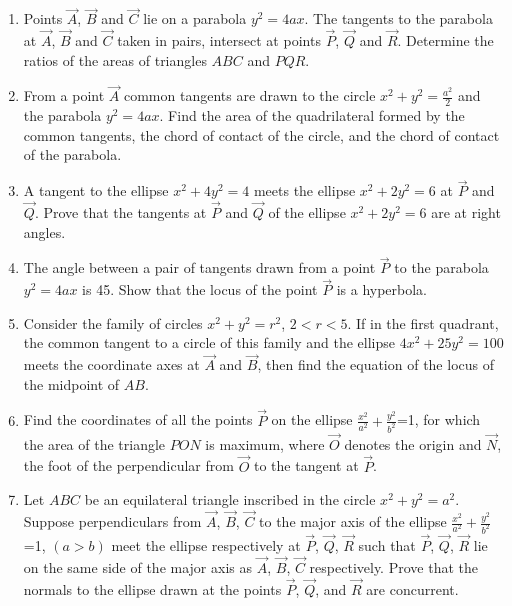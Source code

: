 \begin{enumerate}
\item Points $\vec{A}$, $\vec{B}$ and $\vec{C}$ lie on a parabola $y^2=4ax$. The tangents to the parabola at $\vec{A}$, $\vec{B}$ and $\vec{C}$ taken in pairs, intersect at points $\vec{P}$, $\vec{Q}$ and $\vec{R}$. Determine the ratios of the areas of triangles $ABC$ and $PQR$. \hfill{}

\item From a point $\vec{A}$ common tangents are drawn to the circle $x^2+y^2=\frac{a^2}{2}$ and the parabola $y^2=4ax$. Find the area of the quadrilateral formed by the common tangents, the chord of contact of the circle, and the chord of contact of the parabola. \hfill{}

\item A tangent to the ellipse $x^2+4y^2=4$ meets the ellipse $x^2+2y^2=6$ at $\vec{P}$ and $\vec{Q}$. Prove that the tangents at $\vec{P}$ and $\vec{Q}$ of the ellipse $x^2+2y^2=6$ are at right angles. \hfill{}

\item The angle between a pair of tangents drawn from a point $\vec{P}$ to the parabola $y^2=4ax$ is 45\degree. Show that the locus of the point $\vec{P}$ is a hyperbola. \hfill{}

\item Consider the family of circles $x^2+y^2=r^2$, $2<r<5$. If in the first quadrant, the common tangent to a circle of this family and the ellipse $4x^2+25y^2=100$ meets the coordinate axes at $\vec{A}$ and $\vec{B}$, then find the equation of the locus of the midpoint of $AB$. \hfill{}

\item Find the coordinates of all the points $\vec{P}$ on the ellipse $\frac{x^2}{a^2}+\frac{y^2}{b^2}$=1, for which the area of the triangle $PON$ is maximum, where $\vec{O}$ denotes the origin and $\vec{N}$, the foot of the perpendicular from $\vec{O}$ to the tangent at $\vec{P}$. \hfill{}

\item Let $ABC$ be an equilateral triangle inscribed in the circle $x^2+y^2=a^2$. Suppose perpendiculars from $\vec{A}$, $\vec{B}$, $\vec{C}$ to the major axis of the ellipse $\frac{x^2}{a^2}+\frac{y^2}{b^2}$=1, $(a>b)$ meet the ellipse respectively at $\vec{P}$, $\vec{Q}$, $\vec{R}$ such that $\vec{P}$, $\vec{Q}$, $\vec{R}$ lie on the same side of the major axis as $\vec{A}$, $\vec{B}$, $\vec{C}$ respectively. Prove that the normals to the ellipse drawn at the points $\vec{P}$, $\vec{Q}$, and $\vec{R}$ are concurrent. \hfill{}


\end{enumerate}
